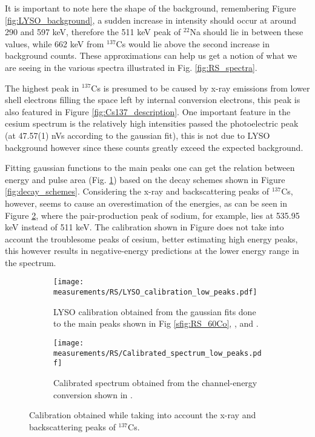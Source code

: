 It is important to note here the shape of the background, remembering Figure \ref{fig:LYSO_background}, a sudden increase in intensity should occur at around 290 and 597 \unit{\kilo\eV}, therefore the 511 \unit{\kilo\eV} peak of $^{22}$Na should lie in between these values, while 662 \unit{\kilo\eV} from $^{137}$Cs would lie above the second increase in background counts. These approximations can help us get a notion of what we are seeing in the various spectra illustrated in Fig. \ref{fig:RS_spectra}.

The highest peak in $^{137}$Cs is presumed to be caused by x-ray emissions from lower shell electrons filling the space left by internal conversion electrons, this peak is also featured in Figure \ref{fig:Cs137_description}. One important feature in the cesium spectrum is the relatively high intensities passed the photoelectric peak (at 47.57(1) nVs according to the gaussian fit), this is not due to LYSO background however since these counts greatly exceed the expected background.

Fitting gaussian functions to the main peaks one can get the relation between energy and pulse area (Fig. \ref{sfig:RS_LYSO_calibration_low_peaks}) based on the decay schemes shown in Figure \ref{fig:decay_schemes}. Considering the x-ray and backscattering peaks of $^{137}$Cs, however, seems to cause an overestimation of the energies, as can be seen in Figure \ref{sfig:RS_LYSO_calibrated_spectrum_low_peaks}, where the pair-production peak of sodium, for example, lies at 535.95 keV instead of 511 keV. The calibration shown in Figure  does not take into account the troublesome peaks of cesium, better estimating high energy peaks, this however results in negative-energy predictions at the lower energy range in the spectrum.

\begin{figure}[H]
  \begin{subfigure}[t]{\textwidth}
    \centering
    \texttt{[image: measurements/RS/LYSO\_calibration\_low\_peaks.pdf]}
    \caption{\label{sfig:RS_LYSO_calibration_low_peaks}LYSO calibration obtained from the gaussian fits done to the main peaks shown in Fig \ref{sfig:RS_60Co}, , and .}
  \end{subfigure}
  \medskip
  \begin{subfigure}[t]{\textwidth}
    \centering
    \texttt{[image: measurements/RS/Calibrated\_spectrum\_low\_peaks.pdf]}
    \caption{\label{sfig:RS_LYSO_calibrated_spectrum_low_peaks}Calibrated spectrum obtained from the channel-energy conversion shown in .}
  \end{subfigure}
  \caption{\label{fig:RS_low_peaks_calibration}Calibration obtained while taking into account the x-ray and backscattering peaks of $^{137}$Cs.}
\end{figure}

